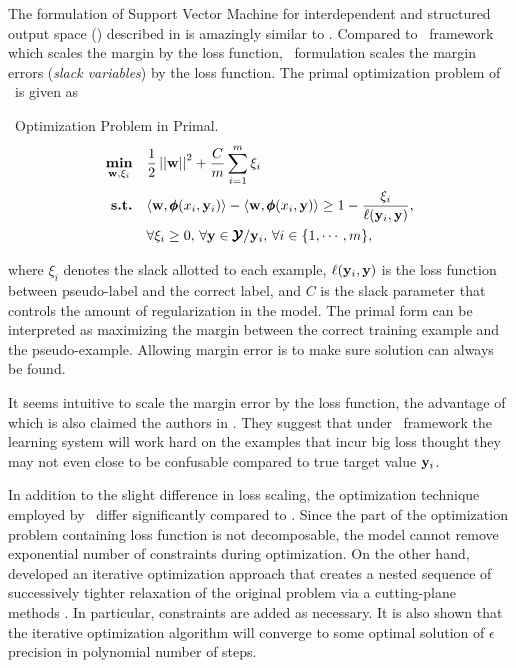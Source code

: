 {The formulation of Support Vector Machine for interdependent and structured output space (\svmstruct) described in \citep{THJA04,TJTA05} is amazingly similar to \mmmn.
Compared to \mmmn\ framework which scales the margin by the loss function, \svmstruct\ formulation scales the margin errors ({\em slack variables}) by the loss function.
The primal optimization problem of \svmstruct\ is given as
\begin{definition}{\svmstruct\ Optimization Problem in Primal.}\label{def_svmstruct}
	\begin{align*}
		\underset{\mathbf {w},\xi_i}{\textbf{min}} & \quad\frac{1}{2}\left|\left| \mathbf {w} \right|\right|^2 + \frac{C}{m}\sum_{i=1}^{m}\xi_i \\
		\textbf{s.t.} & \quad\langle \mathbf {w}, \pmb \phi(x_i,\mathbf {y}_i) \rangle - \langle \mathbf {w}, \pmb \phi(x_i,\mathbf {y}) \rangle \ge 1-\frac{\xi_i}{\mathbf {\ell}(\mathbf {y}_i,\mathbf {y})},\\
		& \quad \forall \xi_i\ge0,\, \forall \mathbf {y}\in\pmb {\mathcal{Y}}/\mathbf {y}_i,\, \forall i\in\{1,\cdots,m\},
	\end{align*}
\end{definition}
where $\xi_i$ denotes the slack allotted to each example, $\mathbf {\ell}(\mathbf {y}_i,\mathbf {y})$ is the loss function between pseudo-label and the correct label, and $C$ is the slack parameter that controls the amount of regularization in the model.
The primal form can be interpreted as maximizing the margin between the correct training example and the pseudo-example.
Allowing margin error is to make sure solution can always be found.

It seems intuitive to scale the margin error by the loss function, the advantage of which is also claimed the authors in \citep[p.3]{THJA04}.
They suggest that under \mmmn\ framework the learning system will work hard on the examples that incur big loss thought they may not even close to be confusable compared to true target value $\mathbf {y}_i$.

In addition to the slight difference in loss scaling, the optimization technique employed by \svmstruct\ differ significantly compared to \mmmn.
Since the part of the \svmstruct optimization problem containing loss function is not decomposable, the model cannot remove exponential number of constraints during optimization.
On the other hand, \citet{THJA04} developed an iterative optimization approach that creates a nested sequence of successively tighter relaxation of the original problem via a cutting-plane methods \citep{Bishop07,JFY09}.
In particular, constraints are added as necessary.
It is also shown that the iterative optimization algorithm will converge to some optimal solution of $\epsilon$ precision in polynomial number of steps.

}
